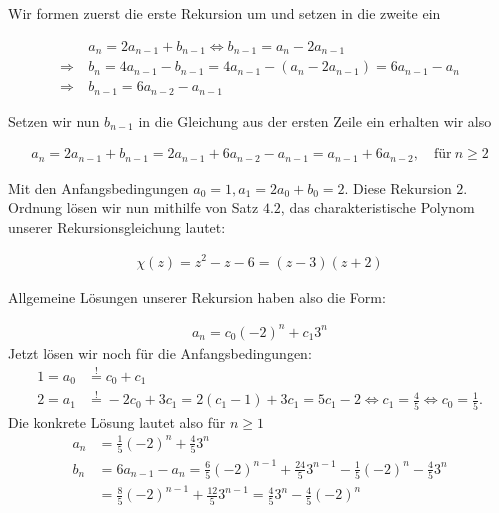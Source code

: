 \begin{solution}
	Wir formen zuerst die erste Rekursion um und setzen in die zweite ein

	\begin{align*}
	&a_n = 2a_{n-1} + b_{n-1}
	\Leftrightarrow
	b_{n-1} = a_n - 2a_{n-1} \\
	\Rightarrow~
	& b_n = 4a_{n-1} - b_{n - 1} = 4a_{n-1} - (a_n - 2a_{n-1}) = 6a_{n-1} - a_n\\
	\Rightarrow~
	&b_{n-1} = 6a_{n-2} - a_{n-1}
	\end{align*}

	Setzen wir nun $b_{n-1}$ in die Gleichung aus der ersten Zeile ein erhalten wir also

	\begin{align*}
	a_n
	= 2a_{n-1} + b_{n-1} = 2a_{n-1} + 6a_{n-2} - a_{n-1} = a_{n-1} + 6a_{n - 2} , \quad \text{für}~ n \geq 2
	\end{align*}

	Mit den Anfangsbedingungen $a_0 = 1, a_1 = 2a_0 + b_0 = 2$. Diese Rekursion $2.$ Ordnung lösen wir nun mithilfe von Satz $4.2$, das charakteristische Polynom unserer Rekursionsgleichung lautet:

	\begin{align*}
	\chi(z)
	=
	z^2 - z -6 = (z - 3)(z + 2)
	\end{align*}

	Allgemeine Lösungen unserer Rekursion haben also die Form:

	\begin{align*}
	a_n
	=
	c_0 (-2)^n + c_1 3^n
	\end{align*}
  Jetzt lösen wir noch für die Anfangsbedingungen:
  \begin{align*}
    1 = a_0 &\stackrel{!}{=} c_0 + c_1 \\
    2 = a_1 &\stackrel{!}{=} -2c_0 + 3c_1 = 2(c_1 - 1) + 3c_1 = 5c_1 - 2 \iff c_1 = \frac{4}{5} \iff c_0 =
    \frac{1}{5}.
  \end{align*}
  Die konkrete Lösung lautet also für $n\geq 1$
  \begin{align*}
    a_n &= \frac{1}{5}(-2)^n + \frac{4}{5}3^n \\
    b_n &= 6a_{n-1} - a_n = \frac{6}{5}(-2)^{n-1} + \frac{24}{5}3^{n-1} - \frac{1}{5}(-2)^n - \frac{4}{5}3^n \\
    &= \frac{8}{5}(-2)^{n-1} + \frac{12}{5}3^{n-1} = \frac{4}{5}3^n - \frac{4}{5}(-2)^n 
  \end{align*}

\end{solution}
